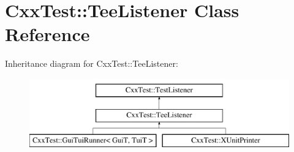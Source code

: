 \hypertarget{classCxxTest_1_1TeeListener}{\section{Cxx\-Test\-:\-:Tee\-Listener Class Reference}
\label{classCxxTest_1_1TeeListener}
}
Inheritance diagram for Cxx\-Test\-:\-:Tee\-Listener\-:\begin{figure}[H]
\begin{center}
\leavevmode
\includegraphics[height=3.000000cm]{classCxxTest_1_1TeeListener}
\end{center}
\end{figure}
